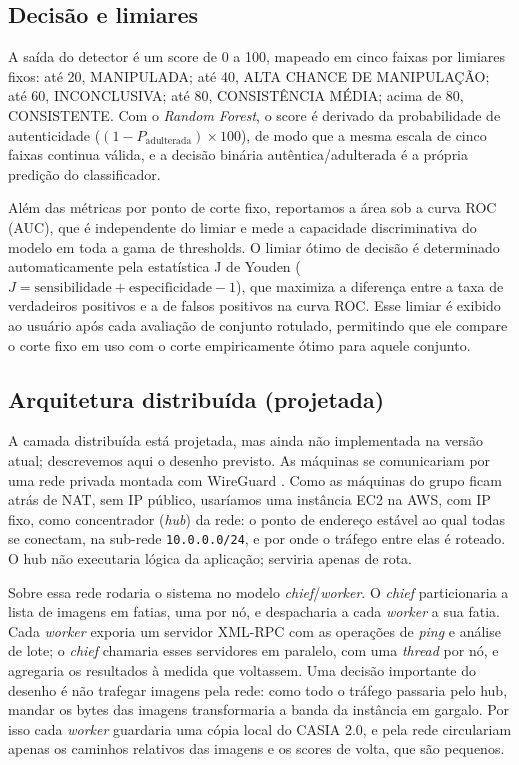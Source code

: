 \documentclass[12pt]{article}
\begin{document}
\subsection{Decisão e limiares}

A saída do detector é um score de 0 a 100, mapeado em cinco faixas por limiares
fixos: até 20, MANIPULADA; até 40, ALTA CHANCE DE MANIPULAÇÃO; até 60,
INCONCLUSIVA; até 80, CONSISTÊNCIA MÉDIA; acima de 80, CONSISTENTE. Com o
\textit{Random Forest}, o score é derivado da probabilidade de autenticidade
($(1-P_{\text{adulterada}})\times 100$), de modo que a mesma escala de cinco
faixas continua válida, e a decisão binária autêntica/adulterada é a própria
predição do classificador.

Além das métricas por ponto de corte fixo, reportamos a área sob a curva ROC
(AUC), que é independente do limiar e mede a capacidade discriminativa do modelo
em toda a gama de thresholds. O limiar ótimo de decisão é determinado
automaticamente pela estatística J de Youden
($J = \mathrm{sensibilidade} + \mathrm{especificidade} - 1$), que maximiza a
diferença entre a taxa de verdadeiros positivos e a de falsos positivos na curva
ROC. Esse limiar é exibido ao usuário após cada avaliação de conjunto rotulado,
permitindo que ele compare o corte fixo em uso com o corte empiricamente ótimo
para aquele conjunto.

\subsection{Arquitetura distribuída (projetada)}

A camada distribuída está projetada, mas ainda não implementada na versão atual;
descrevemos aqui o desenho previsto. As máquinas se comunicariam por uma rede
privada montada com WireGuard \cite{donenfeld2017wireguard}. Como as máquinas do
grupo ficam atrás de NAT, sem IP público, usaríamos uma instância EC2 na AWS, com
IP fixo, como concentrador (\textit{hub}) da rede: o ponto de endereço estável ao
qual todas se conectam, na sub-rede \texttt{10.0.0.0/24}, e por onde o tráfego
entre elas é roteado. O hub não executaria lógica da aplicação; serviria apenas
de rota.

Sobre essa rede rodaria o sistema no modelo \textit{chief}/\textit{worker}. O
\textit{chief} particionaria a lista de imagens em fatias, uma por nó, e
despacharia a cada \textit{worker} a sua fatia. Cada \textit{worker} exporia um
servidor XML-RPC com as operações de \textit{ping} e análise de lote; o
\textit{chief} chamaria esses servidores em paralelo, com uma \textit{thread} por
nó, e agregaria os resultados à medida que voltassem. Uma decisão importante do
desenho é não trafegar imagens pela rede: como todo o tráfego passaria pelo hub,
mandar os bytes das imagens transformaria a banda da instância em gargalo. Por
isso cada \textit{worker} guardaria uma cópia local do CASIA 2.0, e pela rede
circulariam apenas os caminhos relativos das imagens e os scores de volta, que são
pequenos.
\end{document}
